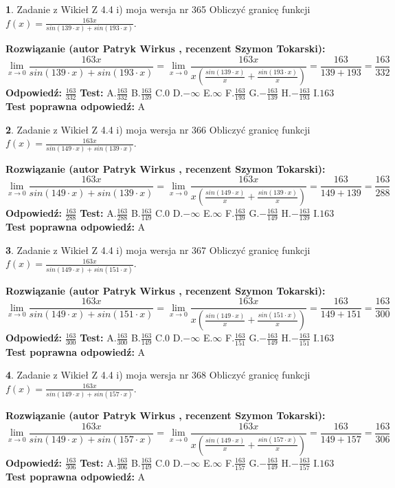 \documentclass[12pt, a4paper]{article}
\theoremstyle{definition} %
\newtheorem{zad}{}
\newcommand{\zadStart}[1]{\begin{zad}#1\newline}
\newcommand{\zadStop}{\end{zad}}
\newcommand{\rozwStart}[2]{\noindent \textbf{Rozwiązanie (autor #1 , recenzent #2): }\newline}
\newcommand{\rozwStop}{\newline}
\newcommand{\odpStart}{\noindent \textbf{Odpowiedź:}\newline}
\newcommand{\odpStop}{\newline}
\newcommand{\testStart}{\noindent \textbf{Test:}\newline}
\newcommand{\testStop}{\newline}
\newcommand{\kluczStart}{\noindent \textbf{Test poprawna odpowiedź:}\newline}
\newcommand{\kluczStop}{\newline}
\begin{document}
\zadStart{Zadanie z Wikieł Z 4.4 i) moja wersja nr 365}
Obliczyć granicę funkcji $f(x)=\frac{163x}{sin(139\cdot x) +sin(193\cdot x)}$.
\zadStop
\rozwStart{Patryk Wirkus}{Szymon Tokarski}
$$\lim\limits_{x\to 0}\frac{163x}{sin(139\cdot x) +sin(193\cdot x)}=\lim\limits_{x\to 0}\frac{163x}{x(\frac{sin(139\cdot x)}{x}+\frac{sin(193\cdot x)}{x})}=\frac{163}{139+193} = \frac{163}{332}$$
\rozwStop
\odpStart
$\frac{163}{332}$
\odpStop
\testStart
A.$\frac{163}{332}$
B.$\frac{163}{139}$
C.$0$
D.$-\infty$
E.$\infty$
F.$\frac{163}{193}$
G.$-\frac{163}{139}$
H.$-\frac{163}{193}$
I.$163$
\testStop
\kluczStart
A
\kluczStop



\zadStart{Zadanie z Wikieł Z 4.4 i) moja wersja nr 366}
Obliczyć granicę funkcji $f(x)=\frac{163x}{sin(149\cdot x) +sin(139\cdot x)}$.
\zadStop
\rozwStart{Patryk Wirkus}{Szymon Tokarski}
$$\lim\limits_{x\to 0}\frac{163x}{sin(149\cdot x) +sin(139\cdot x)}=\lim\limits_{x\to 0}\frac{163x}{x(\frac{sin(149\cdot x)}{x}+\frac{sin(139\cdot x)}{x})}=\frac{163}{149+139} = \frac{163}{288}$$
\rozwStop
\odpStart
$\frac{163}{288}$
\odpStop
\testStart
A.$\frac{163}{288}$
B.$\frac{163}{149}$
C.$0$
D.$-\infty$
E.$\infty$
F.$\frac{163}{139}$
G.$-\frac{163}{149}$
H.$-\frac{163}{139}$
I.$163$
\testStop
\kluczStart
A
\kluczStop



\zadStart{Zadanie z Wikieł Z 4.4 i) moja wersja nr 367}
Obliczyć granicę funkcji $f(x)=\frac{163x}{sin(149\cdot x) +sin(151\cdot x)}$.
\zadStop
\rozwStart{Patryk Wirkus}{Szymon Tokarski}
$$\lim\limits_{x\to 0}\frac{163x}{sin(149\cdot x) +sin(151\cdot x)}=\lim\limits_{x\to 0}\frac{163x}{x(\frac{sin(149\cdot x)}{x}+\frac{sin(151\cdot x)}{x})}=\frac{163}{149+151} = \frac{163}{300}$$
\rozwStop
\odpStart
$\frac{163}{300}$
\odpStop
\testStart
A.$\frac{163}{300}$
B.$\frac{163}{149}$
C.$0$
D.$-\infty$
E.$\infty$
F.$\frac{163}{151}$
G.$-\frac{163}{149}$
H.$-\frac{163}{151}$
I.$163$
\testStop
\kluczStart
A
\kluczStop



\zadStart{Zadanie z Wikieł Z 4.4 i) moja wersja nr 368}
Obliczyć granicę funkcji $f(x)=\frac{163x}{sin(149\cdot x) +sin(157\cdot x)}$.
\zadStop
\rozwStart{Patryk Wirkus}{Szymon Tokarski}
$$\lim\limits_{x\to 0}\frac{163x}{sin(149\cdot x) +sin(157\cdot x)}=\lim\limits_{x\to 0}\frac{163x}{x(\frac{sin(149\cdot x)}{x}+\frac{sin(157\cdot x)}{x})}=\frac{163}{149+157} = \frac{163}{306}$$
\rozwStop
\odpStart
$\frac{163}{306}$
\odpStop
\testStart
A.$\frac{163}{306}$
B.$\frac{163}{149}$
C.$0$
D.$-\infty$
E.$\infty$
F.$\frac{163}{157}$
G.$-\frac{163}{149}$
H.$-\frac{163}{157}$
I.$163$
\testStop
\kluczStart
A
\kluczStop
\end{document}
